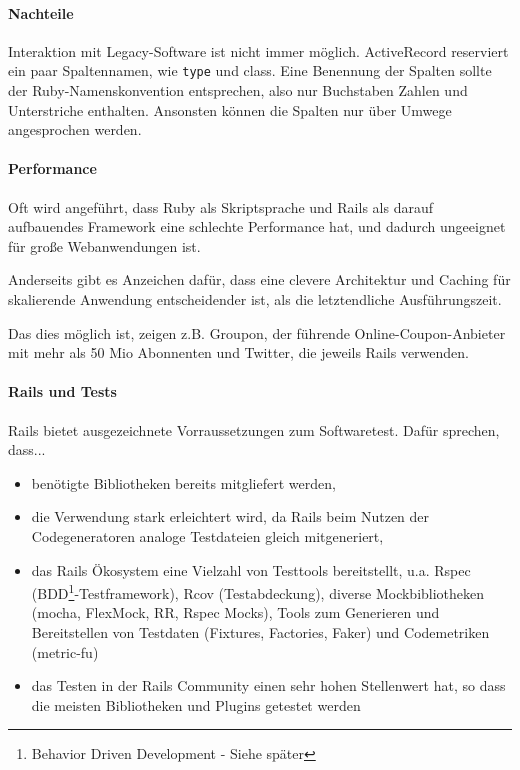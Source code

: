 
\paragraph{Nachteile}
Interaktion mit Legacy-Software ist nicht immer möglich. ActiveRecord reserviert ein paar Spaltennamen, wie \texttt{type} und  class. Eine Benennung der Spalten sollte der Ruby-Namenskonvention entsprechen, also nur Buchstaben Zahlen und Unterstriche enthalten. Ansonsten können die Spalten nur über Umwege angesprochen werden.

\paragraph{Performance} Oft wird angeführt, dass Ruby als Skriptsprache und Rails als darauf aufbauendes Framework eine schlechte Performance hat, und dadurch ungeeignet für große Webanwendungen ist.


Anderseits gibt es Anzeichen dafür, dass eine clevere Architektur und Caching für skalierende Anwendung entscheidender ist, als die letztendliche Ausführungszeit.

Das dies möglich ist, zeigen z.B. Groupon, der führende Online-Coupon-Anbieter mit mehr als 50 Mio Abonnenten und 
Twitter, die jeweils Rails verwenden.

\paragraph{Rails und Tests}
Rails bietet ausgezeichnete Vorraussetzungen zum Softwaretest. Dafür sprechen, dass...

\begin{itemize}
 \item benötigte Bibliotheken bereits mitgliefert werden,
 \item die Verwendung stark erleichtert wird, da Rails beim Nutzen der Codegeneratoren analoge Testdateien gleich mitgeneriert,
 \item das Rails Ökosystem eine Vielzahl von Testtools bereitstellt, u.a. Rspec (BDD\footnote{Behavior Driven Development - Siehe später}-Testframework), Rcov (Testabdeckung), diverse Mockbibliotheken (mocha, FlexMock, RR, Rspec Mocks), Tools zum Generieren und Bereitstellen von Testdaten (Fixtures, Factories, Faker) und Codemetriken (metric-fu)
 \item das Testen in der Rails Community einen sehr hohen Stellenwert hat, so dass die meisten Bibliotheken und Plugins getestet werden
\end{itemize}

